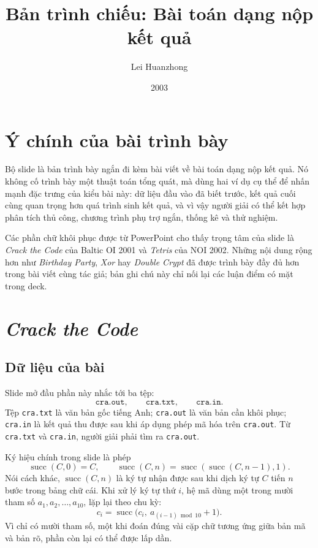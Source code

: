 \documentclass[11pt]{article}
\title{Bản trình chiếu: Bài toán dạng nộp kết quả}
\author{Lei Huanzhong}
\date{2003}
\begin{document}
\maketitle


\section{Ý chính của bài trình bày}

Bộ slide là bản trình bày ngắn đi kèm bài viết về bài toán dạng nộp kết quả.
Nó không cố trình bày một thuật toán tổng quát, mà dùng hai ví dụ cụ thể để
nhấn mạnh đặc trưng của kiểu bài này: dữ liệu đầu vào đã biết trước, kết quả
cuối cùng quan trọng hơn quá trình sinh kết quả, và vì vậy người giải có thể
kết hợp phân tích thủ công, chương trình phụ trợ ngắn, thống kê và thử nghiệm.

Các phần chữ khôi phục được từ PowerPoint cho thấy trọng tâm của slide là
\textit{Crack the Code} của Baltic OI 2001 và \textit{Tetris} của NOI 2002.
Những nội dung rộng hơn như \textit{Birthday Party}, \textit{Xor} hay
\textit{Double Crypt} đã được trình bày đầy đủ hơn trong bài viết cùng tác
giả; bản ghi chú này chỉ nối lại các luận điểm có mặt trong deck.

\section{\textit{Crack the Code}}

\subsection{Dữ liệu của bài}

Slide mở đầu phần này nhắc tới ba tệp:
\[
  \texttt{cra.out},\qquad \texttt{cra.txt},\qquad \texttt{cra.in}.
\]
Tệp \texttt{cra.txt} là văn bản gốc tiếng Anh; \texttt{cra.out} là văn bản
cần khôi phục; \texttt{cra.in} là kết quả thu được sau khi áp dụng phép mã hóa
trên \texttt{cra.out}. Từ \texttt{cra.txt} và \texttt{cra.in}, người giải phải
tìm ra \texttt{cra.out}.

Ký hiệu chính trong slide là phép
\[
  \operatorname{succ}(C,0)=C,\qquad
  \operatorname{succ}(C,n)=\operatorname{succ}(\operatorname{succ}(C,n-1),1).
\]
Nói cách khác, \(\operatorname{succ}(C,n)\) là ký tự nhận được sau khi dịch
ký tự \(C\) tiến \(n\) bước trong bảng chữ cái. Khi xử lý ký tự thứ \(i\), hệ
mã dùng một trong mười tham số \(a_1,a_2,\ldots,a_{10}\), lặp lại theo chu kỳ:
\[
  c_i=\operatorname{succ}\bigl(c_i,\ a_{(i-1)\bmod 10}+1\bigr).
\]
Vì chỉ có mười tham số, một khi đoán đúng vài cặp chữ tương ứng giữa bản mã và
bản rõ, phần còn lại có thể được lấp dần.
\end{document}
